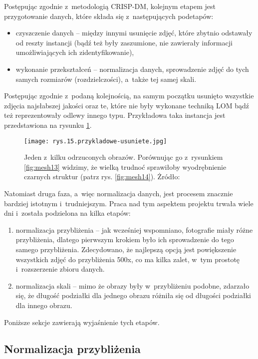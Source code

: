 Postępując zgodnie z~metodologią CRISP-DM, kolejnym etapem jest przygotowanie danych, które składa się z~następujących podetapów:
\begin{itemize}
\item czyszczenie danych – między innymi usunięcie zdjęć, które zbytnio odstawały od reszty instancji (bądź też były zaszumione, nie zawierały informacji umożliwiających ich zidentyfikowanie),
\item wykonanie przekształceń – normalizacja danych, sprowadzenie zdjęć do tych samych rozmiarów (rozdzielczości), a~także tej samej skali.
\end{itemize}
Postępując zgodnie z~podaną kolejnością, na samym początku usunięto wszystkie zdjęcia najsłabszej jakości oraz te, które nie były wykonane techniką LOM bądź też reprezentowały odlewy innego typu. Przykładowa taka instancja jest przedstawiona na rysunku \ref{fig:mesh15}. %
\begin{figure}[h]
    \centering
    \texttt{[image: rys.15.przykladowe-usuniete.jpg]}
    \caption{Jeden z~kilku odrzuconych obrazów. Porównując go z~rysunkiem \ref{fig:mesh13} widzimy, że wielką trudnoć sprawiłoby wyodrębnienie czarnych struktur (patrz rys. \ref{fig:mesh14}). Żródło: \cite{Pirowski17}}
    \label{fig:mesh15}
\end{figure}
Natomiast druga faza, a~więc normalizacja danych, jest procesem znacznie bardziej istotnym i~trudniejszym. Praca nad tym aspektem projektu trwała wiele dni i~została podzielona na kilka etapów:
\begin{enumerate}
\item normalizacja przybliżenia – jak wcześniej wspomniano, fotografie miały różne przybliżenia, dlatego pierwszym krokiem było ich sprowadzenie do tego samego przybliżenia. Zdecydowano, że najlepszą opcją jest powiększenie wszystkich zdjęć do przybliżenia 500x, co ma kilka zalet, w~tym prostotę i~rozszerzenie zbioru danych.
\item normalizacja skali – mimo że obrazy były w~przybliżeniu podobne, zdarzało się, że długość podziałki dla jednego obrazu różniła się od długości podziałki dla innego obrazu.
\end{enumerate}
Poniższe sekcje zawierają wyjaśnienie tych etapów.


\subsection{Normalizacja przybliżenia}
\label{sec:normalizacja_przyblizenia}

